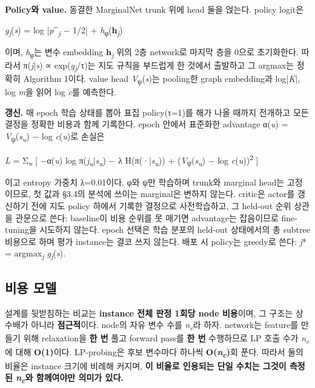 \documentclass[final,5p,twocolumn]{elsarticle}
\begin{document}
\textbf{Policy와 value.} 동결한 MarginalNet trunk 위에 head 둘을 얹는다. policy logit은

\begin{center}\small \textit{g\textsubscript{j}}(\textit{s}) = log |\textit{p}\^{}\textsubscript{\textit{j}} − 1/2| + \textit{h}\textsubscript{φ}(\textbf{h}\textsubscript{\textit{j}})\end{center}
이며, \textit{h}\textsubscript{φ}는 변수 embedding \textbf{h}\textsubscript{\textit{j}} 위의 2층 network로 마지막 층을 0으로 초기화한다. 따라서 π(\textit{j}|\textit{s}) ∝ exp(\textit{g\textsubscript{j}}/τ)는 지도 규칙을 부드럽게 한 것에서 출발하고 그 argmax는 정확히 Algorithm 1이다. value head \textit{V}\textsubscript{ψ}(\textit{s})는 pooling한 graph embedding과 log|\textit{K}|, log \textit{m}을 읽어 log \textit{c}를 예측한다.

\textbf{갱신.} 매 epoch 학습 상태를 뽑아 표집 policy(τ=1)를 해가 나올 때까지 전개하고 모든 결정을 정확한 비용과 함께 기록한다. epoch 안에서 표준화한 advantage α(\textit{u}) = \textit{V}\textsubscript{ψ}(\textit{s\textsubscript{u}}) − log \textit{c}(\textit{u})로 손실은

\begin{center}\small \textit{L} = Σ\textsubscript{\textit{u}} [ −α(\textit{u}) log π(\textit{j\textsubscript{u}}|\textit{s\textsubscript{u}}) − λ H(π(·|\textit{s\textsubscript{u}})) + (\textit{V}\textsubscript{ψ}(\textit{s\textsubscript{u}}) − log \textit{c}(\textit{u}))\textsuperscript{2} ]\end{center}
이고 entropy 가중치 λ=0.01이다. φ와 ψ만 학습하며 trunk와 marginal head는 고정이므로, 첫 값과 §3.4의 분석에 쓰이는 marginal은 변하지 않는다. critic은 actor를 갱신하기 전에 지도 policy 하에서 기록한 결정으로 사전학습하고, 그 held-out 순위 상관을 관문으로 쓴다: baseline이 비용 순위를 못 매기면 advantage는 잡음이므로 fine-tuning을 시도하지 않는다. epoch 선택은 학습 분포의 held-out 상태에서의 총 subtree 비용으로 하며 평가 instance는 결코 쓰지 않는다. 배포 시 policy는 greedy로 쓴다: \textit{j}* = argmax\textsubscript{\textit{j}} \textit{g\textsubscript{j}}(\textit{s}).

\subsection{비용 모델}
설계를 뒷받침하는 비교는 \textbf{instance 전체 판정 1회당 node 비용}이며, 그 구조는 상수배가 아니라 \textbf{점근적}이다. node의 자유 변수 수를 \textit{n\textsubscript{c}}라 하자. network는 feature를 만들기 위해 relaxation을 \textbf{한 번} 풀고 forward pass를 \textbf{한 번} 수행하므로 LP 호출 수가 \textit{n\textsubscript{c}}에 대해 \textbf{O(1)}이다. LP-probing은 후보 변수마다 하나씩 \textbf{O(\textit{n\textsubscript{c}})}회 푼다. 따라서 둘의 비율은 instance 크기에 비례해 커지며, \textbf{이 비율로 인용되는 단일 수치는 그것이 측정된 \textit{n\textsubscript{c}}와 함께여야만 의미가 있다.}
\end{document}

